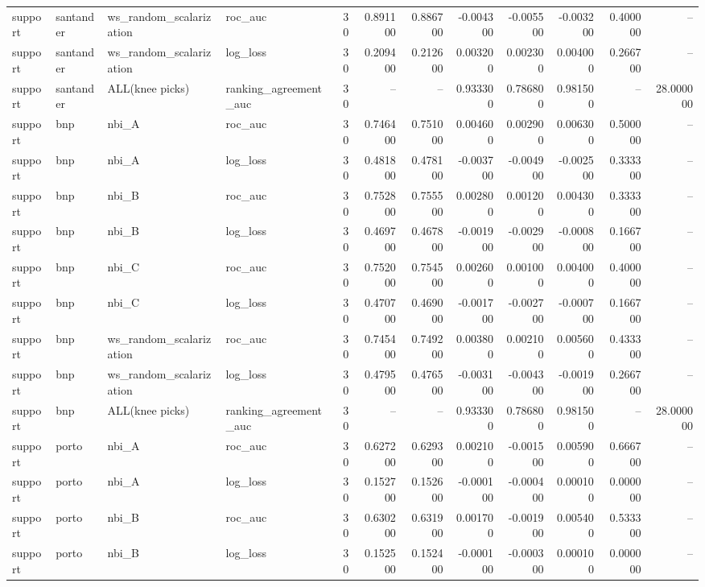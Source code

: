 \begin{landscape}
\begin{longtable}{llllrrrrrrrr}
support & santander & ws\_random\_scalarization & roc\_auc & 30 & 0.891100 & 0.886700 & -0.004300 & -0.005500 & -0.003200 & 0.400000 & -- \\
support & santander & ws\_random\_scalarization & log\_loss & 30 & 0.209400 & 0.212600 & 0.003200 & 0.002300 & 0.004000 & 0.266700 & -- \\
support & santander & ALL(knee picks) & ranking\_agreement\_auc & 30 & -- & -- & 0.933300 & 0.786800 & 0.981500 & -- & 28.000000 \\
support & bnp & nbi\_A & roc\_auc & 30 & 0.746400 & 0.751000 & 0.004600 & 0.002900 & 0.006300 & 0.500000 & -- \\
support & bnp & nbi\_A & log\_loss & 30 & 0.481800 & 0.478100 & -0.003700 & -0.004900 & -0.002500 & 0.333300 & -- \\
support & bnp & nbi\_B & roc\_auc & 30 & 0.752800 & 0.755500 & 0.002800 & 0.001200 & 0.004300 & 0.333300 & -- \\
support & bnp & nbi\_B & log\_loss & 30 & 0.469700 & 0.467800 & -0.001900 & -0.002900 & -0.000800 & 0.166700 & -- \\
support & bnp & nbi\_C & roc\_auc & 30 & 0.752000 & 0.754500 & 0.002600 & 0.001000 & 0.004000 & 0.400000 & -- \\
support & bnp & nbi\_C & log\_loss & 30 & 0.470700 & 0.469000 & -0.001700 & -0.002700 & -0.000700 & 0.166700 & -- \\
support & bnp & ws\_random\_scalarization & roc\_auc & 30 & 0.745400 & 0.749200 & 0.003800 & 0.002100 & 0.005600 & 0.433300 & -- \\
support & bnp & ws\_random\_scalarization & log\_loss & 30 & 0.479500 & 0.476500 & -0.003100 & -0.004300 & -0.001900 & 0.266700 & -- \\
support & bnp & ALL(knee picks) & ranking\_agreement\_auc & 30 & -- & -- & 0.933300 & 0.786800 & 0.981500 & -- & 28.000000 \\
support & porto & nbi\_A & roc\_auc & 30 & 0.627200 & 0.629300 & 0.002100 & -0.001500 & 0.005900 & 0.666700 & -- \\
support & porto & nbi\_A & log\_loss & 30 & 0.152700 & 0.152600 & -0.000100 & -0.000400 & 0.000100 & 0.000000 & -- \\
support & porto & nbi\_B & roc\_auc & 30 & 0.630200 & 0.631900 & 0.001700 & -0.001900 & 0.005400 & 0.533300 & -- \\
support & porto & nbi\_B & log\_loss & 30 & 0.152500 & 0.152400 & -0.000100 & -0.000300 & 0.000100 & 0.000000 & -- \\

\end{longtable}
\end{landscape}

